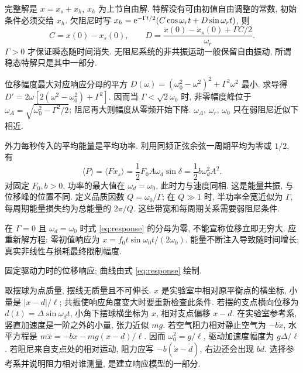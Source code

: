 完整解是 $x=x_s+x_h$, $x_h$ 为上节自由解. 特解没有可由初值自由调整的常数, 初始条件必须交给 $x_h$. 欠阻尼时写 $x_h=\mathrm e^{-\Gamma t/2}(C\cos\omega_rt+D\sin\omega_rt)$, 则
\[
C=x(0)-x_s(0),\qquad
D=\frac{\dot x(0)-\dot x_s(0)+\Gamma C/2}{\omega_r}.
\]
$\Gamma>0$ 才保证瞬态随时间消失. 无阻尼系统的非共振运动一般保留自由振动, 所谓稳态特解只是其中一部分.

位移幅度最大对应响应分母的平方 $D(\omega)=(\omega_0^2-\omega^2)^2+\Gamma^2\omega^2$ 最小. 求导得 $D'=2\omega[2(\omega^2-\omega_0^2)+\Gamma^2]$. 因而当 $\Gamma<\sqrt2\omega_0$ 时, 非零幅度峰位于 $\omega_A=\sqrt{\omega_0^2-\Gamma^2/2}$; 阻尼再大则幅度从零频开始下降. $\omega_A$, $\omega_r$, $\omega_0$ 只在弱阻尼近似下相近.

外力每秒传入的平均能量是平均功率. 利用同频正弦余弦一周期平均为零或 $1/2$, 有
\[
\langle P\rangle=\langle F\dot x_s\rangle
=\frac12F_0A\omega_d\sin\delta
=\frac12 b\omega_d^2A^2.
\]
对固定 $F_0,b>0$, 功率的最大值在 $\omega_d=\omega_0$, 此时力与速度同相. 这是能量共振, 与位移峰的位置不同. 定义品质因数 $Q=\omega_0/\Gamma$; 在 $Q\gg1$ 时, 半功率全宽近似为 $\Gamma$, 每周期能量损失约为总能量的 $2\pi/Q$. 这些带宽和每周期关系需要弱阻尼条件.

在 $\Gamma=0$ 且 $\omega_d=\omega_0$ 时式 \eqref{eq:response} 的分母为零, 不能宣称位移立即无穷大. 应重新解方程: 零初值响应为 $x=f_0t\sin\omega_0t/(2\omega_0)$. 能量不断注入导致随时间增长; 真实非线性与损耗最终限制幅度.

\begin{center}
\par
固定驱动力时的位移响应; 曲线由式 \eqref{eq:response} 绘制.
\end{center}

取摆球为点质量, 摆线无质量且不可伸长. $x$ 是实验室中相对原平衡点的横坐标, 小量是 $|x-d|/\ell$; 共振使响应角度变大时要重新检查此条件. 若摆的支点横向位移为 $d(t)=\Delta\sin\omega_dt$, 小角下摆球横坐标为 $x$, 相对支点偏移 $x-d$. 在实验室参考系, 竖直加速度是一阶之外的小量, 张力近似 $mg$. 若空气阻力相对静止空气为 $-b\dot x$, 水平方程是 $m\ddot x=-b\dot x-mg(x-d)/\ell$. 因而 $\omega_0^2=g/\ell$, 驱动加速度幅度为 $g\Delta/\ell$. 若阻尼来自支点处的相对运动, 阻力应写 $-b(\dot x-\dot d)$, 右边还会出现 $b\dot d$. 选择参考系并说明阻力相对谁测量, 是建立响应模型的一部分.
